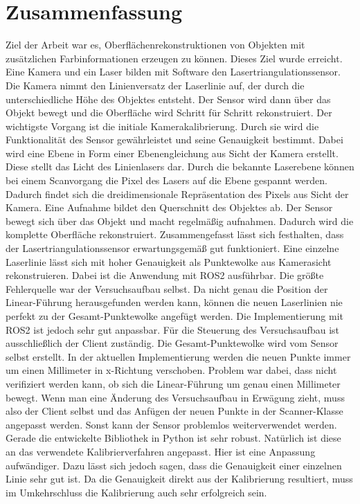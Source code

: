 \section{Zusammenfassung}\label{zusammenfassung}
	Ziel der Arbeit war es, Oberflächenrekonstruktionen von Objekten mit zusätzlichen Farbinformationen erzeugen zu können. Dieses Ziel wurde erreicht. Eine Kamera und ein Laser bilden mit Software den Lasertriangulationssensor. Die Kamera nimmt den Linienversatz der Laserlinie auf, der durch die unterschiedliche Höhe des Objektes entsteht. Der Sensor wird dann über das Objekt bewegt und die Oberfläche wird Schritt für Schritt rekonstruiert. Der wichtigste Vorgang ist die initiale Kamerakalibrierung. Durch sie wird die Funktionalität des Sensor gewährleistet und seine Genauigkeit bestimmt. Dabei wird eine Ebene in Form einer Ebenengleichung aus Sicht der Kamera erstellt. Diese stellt das Licht des Linienlasers dar. Durch die bekannte Laserebene können bei einem Scanvorgang die Pixel des Lasers auf die Ebene gespannt werden. Dadurch findet sich die dreidimensionale Repräsentation des Pixels aus Sicht der Kamera. Eine Aufnahme bildet den Querschnitt des Objektes ab. Der Sensor bewegt sich über das Objekt und macht regelmäßig aufnahmen. Dadurch wird die komplette Oberfläche rekonstruiert. \newline
	Zusammengefasst lässt sich festhalten, dass der Lasertriangulationssensor erwartungsgemäß gut funktioniert. Eine einzelne Laserlinie lässt sich mit hoher Genauigkeit als Punktewolke aus Kamerasicht rekonstruieren. Dabei ist die Anwendung mit ROS2 ausführbar. Die größte Fehlerquelle war der Versuchsaufbau selbst. Da nicht genau die Position der Linear-Führung herausgefunden werden kann, können die neuen Laserlinien nie perfekt zu der Gesamt-Punktewolke angefügt werden. Die Implementierung mit ROS2 ist jedoch sehr gut anpassbar. Für die Steuerung des Versuchsaufbau ist ausschließlich der Client zuständig. Die Gesamt-Punktewolke wird vom Sensor selbst erstellt. In der aktuellen Implementierung werden die neuen Punkte immer um einen Millimeter in x-Richtung verschoben. Problem war dabei, dass nicht verifiziert werden kann, ob sich die Linear-Führung um genau einen Millimeter bewegt. Wenn man eine Änderung des Versuchsaufbau in Erwägung zieht, muss also der Client selbst und das Anfügen der neuen Punkte in der Scanner-Klasse angepasst werden. Sonst kann der Sensor problemlos weiterverwendet werden. Gerade die entwickelte Bibliothek in Python ist sehr robust. Natürlich ist diese an das verwendete Kalibrierverfahren angepasst. Hier ist eine Anpassung aufwändiger. Dazu lässt sich jedoch sagen, dass die Genauigkeit einer einzelnen Linie sehr gut ist. Da die Genauigkeit direkt aus der Kalibrierung resultiert, muss im Umkehrschluss die Kalibrierung auch sehr erfolgreich sein. \newline

